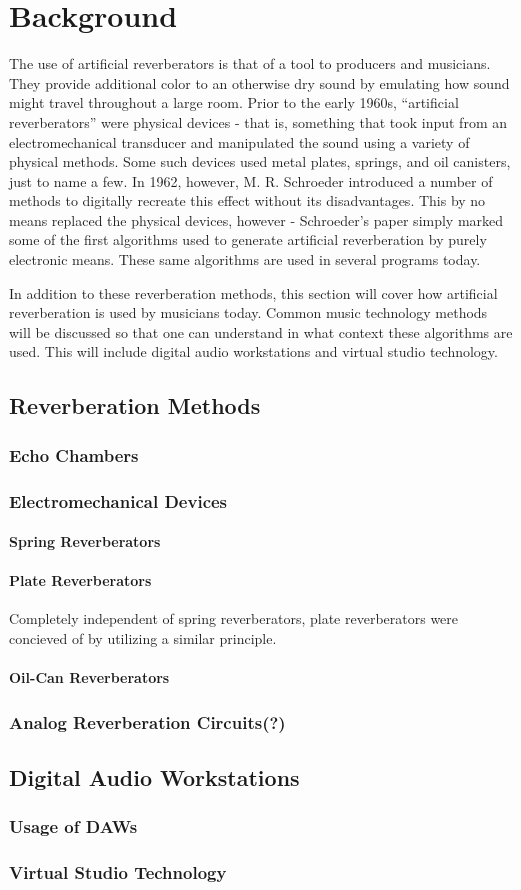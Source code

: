 \chapter{Background}
The use of artificial reverberators is that of a tool to producers and musicians. They provide additional color to an otherwise dry sound by emulating how sound might travel throughout a large room. Prior to the early 1960s, ``artificial reverberators'' were physical devices - that is, something that took input from an electromechanical transducer and manipulated the sound using a variety of physical methods. Some such devices used metal plates, springs, and oil canisters, just to name a few. In 1962, however, M. R. Schroeder introduced a number of methods to digitally recreate this effect without its disadvantages. This by no means replaced the physical devices, however - Schroeder's paper simply marked some of the first algorithms used to generate artificial reverberation by purely electronic means. These same algorithms are used in several programs today.

In addition to these reverberation methods, this section will cover how artificial reverberation is used by musicians today. Common music technology methods will be discussed so that one can understand in what context these algorithms are used. This will include digital audio workstations and virtual studio technology.

\section{Reverberation Methods}
\subsection{Echo Chambers}

\subsection{Electromechanical Devices}
\subsubsection{Spring Reverberators}
\subsubsection{Plate Reverberators}
Completely independent of spring reverberators, plate reverberators were concieved of by utilizing a similar principle.

\subsubsection{Oil-Can Reverberators}
\subsection{Analog Reverberation Circuits(?)}
\section{Digital Audio Workstations}
\subsection{Usage of DAWs}
\subsection{Virtual Studio Technology}
